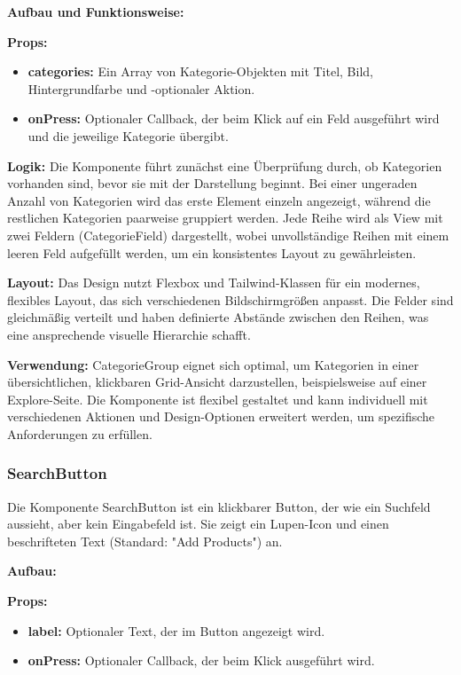 \documentclass[12pt, a4paper]{report} %
\begin{document}
\noindent\textbf{Aufbau und Funktionsweise:}

\textbf{Props:}
\begin{itemize}
    \item \textbf{categories:} Ein Array von Kategorie-Objekten mit Titel, Bild, Hintergrundfarbe und -optionaler Aktion.
    \item \textbf{onPress:} Optionaler Callback, der beim Klick auf ein Feld ausgeführt wird und die jeweilige Kategorie übergibt.
\end{itemize}

\textbf{Logik:}
Die Komponente führt zunächst eine Überprüfung durch, ob Kategorien vorhanden sind, bevor sie mit der Darstellung beginnt. Bei einer ungeraden Anzahl von Kategorien wird das erste Element einzeln angezeigt, während die restlichen Kategorien paarweise gruppiert werden. Jede Reihe wird als View mit zwei Feldern (CategorieField) dargestellt, wobei unvollständige Reihen mit einem leeren Feld aufgefüllt werden, um ein konsistentes Layout zu gewährleisten.

\textbf{Layout:}
Das Design nutzt Flexbox und Tailwind-Klassen für ein modernes, flexibles Layout, das sich verschiedenen Bildschirmgrößen anpasst. Die Felder sind gleichmäßig verteilt und haben definierte Abstände zwischen den Reihen, was eine ansprechende visuelle Hierarchie schafft.

\noindent\textbf{Verwendung:} CategorieGroup eignet sich optimal, um Kategorien in einer übersichtlichen, klickbaren Grid-Ansicht darzustellen, beispielsweise auf einer Explore-Seite. Die Komponente ist flexibel gestaltet und kann individuell mit verschiedenen Aktionen und Design-Optionen erweitert werden, um spezifische Anforderungen zu erfüllen.

\subsubsection{SearchButton}
Die Komponente SearchButton ist ein klickbarer Button, der wie ein Suchfeld aussieht, aber kein Eingabefeld ist. Sie zeigt ein Lupen-Icon und einen beschrifteten Text (Standard: "Add Products") an.

\noindent\textbf{Aufbau:}

\textbf{Props:}
\begin{itemize}
    \item \textbf{label:} Optionaler Text, der im Button angezeigt wird.
    \item \textbf{onPress:} Optionaler Callback, der beim Klick ausgeführt wird.
\end{itemize}
\end{document}
